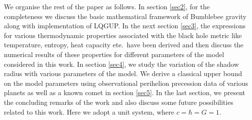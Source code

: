 \documentclass[aps,amsmath,amssymb,showpacs,showkeys]{revtex4}
\begin{document}
We organise the rest of the paper as follows. In section \ref{sec2}, for the 
completeness we discuss the basic mathematical framework of Bumblebee gravity 
along with implementation of LQGUP. In the next section \ref{sec3}, 
the expressions for various thermodynamic properties associated with the black 
hole metric like temperature, entropy, heat capacity ete.\ have been derived 
and then discuss the numerical results of these properties for different 
parameters of the model considered in this work. In section \ref{sec4}, we 
study the variation of the shadow radius with various parameters of the model. 
We derive a classical upper bound on the model parameters using observational 
perihelion precession data of various planets as well as a known comet in 
section \ref{sec5}. In the last section, we present the concluding remarks of 
the work and also discuss some future possibilities related to this work. Here
we adopt a unit system, where $c = \hbar = G = 1$.
\end{document}
